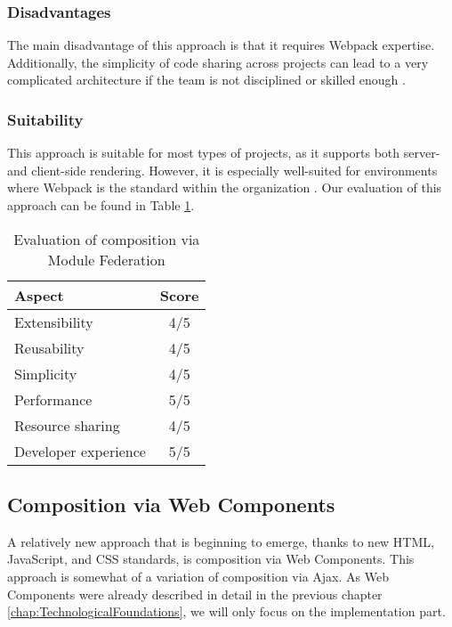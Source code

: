 \subsubsection{Disadvantages}
The main disadvantage of this approach is that it requires Webpack expertise. Additionally, the simplicity of code sharing across projects can lead to a very complicated architecture if the team is not disciplined or skilled enough \cite{MezzaliraBuildingMf}.

\subsubsection{Suitability}
This approach is suitable for most types of projects, as it supports both server- and client-side rendering. However, it is especially well-suited for environments where Webpack is the standard within the organization \cite{Taibi}. Our evaluation of this approach can be found in Table \ref{table:module-federation-evaluation}.  

\begin{table}[h]
  \centering
  \begin{tabular}{|p{4cm}|c|}
     \hline
        \textbf{Aspect} & \textbf{Score} \\
     \hline
        Extensibility & 4/5 \\
     \hline
        Reusability & 4/5 \\
     \hline
        Simplicity & 4/5 \\
     \hline
        Performance & 5/5 \\
     \hline
        Resource sharing & 4/5 \\
     \hline
        Developer experience & 5/5 \\
     \hline
  \end{tabular}
  \caption{Evaluation of composition via Module Federation}
  \label{table:module-federation-evaluation}
\end{table}


\subsection{Composition via Web Components}
A relatively new approach that is beginning to emerge, thanks to new HTML, JavaScript, and CSS standards, is composition via Web Components. This approach is somewhat of a variation of composition via Ajax. As Web Components were already described in detail in the previous chapter \ref{chap:TechnologicalFoundations}, we will only focus on the implementation part. \\

